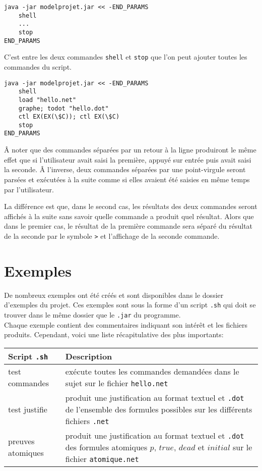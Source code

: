 \documentclass[dvipsnames]{report}
\begin{document}
\begin{verbatim}
java -jar modelprojet.jar << -END_PARAMS
    shell
    ...
    stop
END_PARAMS
\end{verbatim}

C'est entre les deux commandes \texttt{shell} et \texttt{stop} que l'on peut ajouter toutes les commandes du script.

\begin{verbatim}
java -jar modelprojet.jar << -END_PARAMS
    shell
    load "hello.net"
    graphe; todot "hello.dot"
    ctl EX(EX(\$C)); ctl EX(\$C)
    stop
END_PARAMS
\end{verbatim}

\^{A} noter que des commandes séparées par un retour à la ligne produiront le même effet que si l'utilisateur avait saisi la première, appuyé sur entrée puis avait saisi la seconde. \^{A} l'inverse, deux commandes séparées par une point-virgule seront parsées et exécutées à la suite comme si elles avaient été saisies en même temps par l'utilisateur.

La différence est que, dans le second cas, les résultats des deux commandes seront affichés à la suite sans savoir quelle commande a produit quel résultat. Alors que dans le premier cas, le résultat de la première commande sera séparé du résultat de la seconde par le symbole \texttt{>} et l'affichage de la seconde commande.

\section{Exemples}

De nombreux exemples ont été créés et sont disponibles dans le dossier d'exemples du projet. Ces exemples sont sous la forme d'un script \texttt{.sh} qui doit se trouver dans le même dossier que le \texttt{.jar} du programme.\\

Chaque exemple contient des commentaires indiquant son intérêt et les fichiers produits. Cependant, voici une liste récapitulative des plus importants:\\

\noindent\begin{tabularx}{\linewidth}{| @{}l | X@{} |}
\hline
Script \texttt{.sh} & Description \\
\hline
test commandes & exécute toutes les commandes demandées dans le sujet sur le fichier \texttt{hello.net} \\
\hline
test justifie & produit une justification au format textuel et \texttt{.dot} de l'ensemble des formules possibles sur les différents fichiers \texttt{.net} \\
\hline
preuves atomiques & produit une justification au format textuel et \texttt{.dot} des formules atomiques $p$, $true$, $dead$ et $initial$ sur le fichier \texttt{atomique.net} \\
\hline
\end{tabularx}
\end{document}
